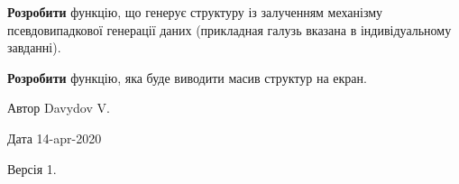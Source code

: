 
\begin{DoxyEnumerate}
\item {\bfseries{Розробити}} функцію, що генерує структуру із залученням механізму псевдовипадкової генерації даних (прикладная галузь вказана в індивідуальному завданні).
\item {\bfseries{Розробити}} функцію, яка буде виводити масив структур на екран.
\end{DoxyEnumerate}

\begin{DoxyAuthor}{Автор}
Davydov V. 
\end{DoxyAuthor}
\begin{DoxyDate}{Дата}
14-\/apr-\/2020 
\end{DoxyDate}
\begin{DoxyVersion}{Версія}
1. 
\end{DoxyVersion}
